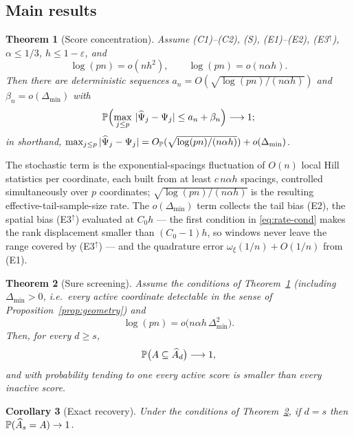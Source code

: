 \documentclass[bj,authoryear]{imsart}
\theoremstyle{plain}
\newtheorem{theorem}{Theorem}[section]
\newtheorem{corollary}[theorem]{Corollary}
\newcommand{\A}{A}\newcommand{\I}{I_\varepsilon}
\begin{document}
\subsection{Main results}

\begin{theorem}[Score concentration]\label{thm:score}
Assume (C1)--(C2), (S), (E1)--(E2), (E3$^{\uparrow}$), $\alpha\le1/3$,
$h\le1-\varepsilon$, and
\begin{equation}\label{eq:rate-cond}
 \log(pn)=o(nh^2),
 \qquad
 \log(pn)=o(n\alpha h).
\end{equation}
Then there are deterministic sequences
$a_n=O(\sqrt{\log(pn)/(n\alpha h)})$ and $\beta_n=o(\Delta_{\min})$ with
\[
 \mathbb P\Bigl(\max_{j\le p}\,|\widehat\Psi_j-\Psi_j|\le a_n+\beta_n\Bigr)
 \longrightarrow1;
\]
in shorthand,
$\max_{j\le p}|\widehat\Psi_j-\Psi_j|
=O_{\mathbb P}(\sqrt{\log(pn)/(n\alpha h)})+o(\Delta_{\min})$.
\end{theorem}

The stochastic term is the exponential-spacings fluctuation of
$O(n)$ local Hill statistics per coordinate, each built from at least
$c\,n\alpha h$ spacings, controlled simultaneously over $p$ coordinates;
$\sqrt{\log(pn)/(n\alpha h)}$ is the resulting effective-tail-sample-size
rate. The $o(\Delta_{\min})$ term collects the tail bias (E2), the spatial
bias (E3$^{\uparrow}$) evaluated at $C_0h$ --- the first condition in
\eqref{eq:rate-cond} makes the rank displacement smaller than $(C_0-1)h$,
so windows never leave the range covered by (E3$^{\uparrow}$) --- and the
quadrature
error $\omega_\xi(1/n)+O(1/n)$ from (E1).

\begin{theorem}[Sure screening]\label{thm:sis}
Assume the conditions of Theorem~\ref{thm:score} (including
$\Delta_{\min}>0$, i.e.\ every active coordinate detectable in the
sense of Proposition~\ref{prop:geometry}) and
\begin{equation}\label{eq:sis-cond}
 \log(pn)=o\bigl(n\alpha h\,\Delta_{\min}^2\bigr).
\end{equation}
Then, for every $d\ge s$,
\[
 \Pp\bigl(\A\subseteq\widehat\A_d\bigr)\longrightarrow1,
\]
and with probability tending to one every active score is smaller than
every inactive score.
\end{theorem}

\begin{corollary}[Exact recovery]\label{cor:exact}
Under the conditions of Theorem~\ref{thm:sis}, if $d=s$ then
$\Pp(\widehat\A_s=\A)\to1$.
\end{corollary}
\end{document}
